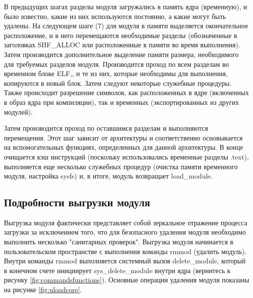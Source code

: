 В предыдущих шагах разделы модуля загружались в память ядра (временную), и было известно, какие из них используются постоянно, а какие могут быть удалены. 
На следующем шаге (7) для модуля в памяти выделяется окончательное расположение, и в него перемещаются необходимые разделы (обозначенные в заголовках SHF\_ALLOC или расположенные в памяти во время выполнения). 
Затем производится дополнительное выделение памяти размера, необходимого для требуемых разделов модуля. 
Производится проход по всем разделам во временном блоке ELF,, и те из них, которые необходимы для выполнения, копируются в новый блок. 
Затем следуют некоторые служебные процедуры. 
Также происходит разрешение символов, как расположенных в ядре (включенных в образ ядра при компиляции), так и временных (экспортированных из других модулей).

Затем производится проход по оставшимся разделам и выполняются перемещения. Этот шаг зависит от архитектуры и соответственно основывается на вспомогательных функциях, определенных для данной архитектуры.
В конце очищается кэш инструкций (поскольку использовались временные разделы .text), выполняется еще несколько служебных процедур (очистка памяти временного модуля, настройка sysfs) и, в итоге, модуль возвращает load\_module.

\subsection{Подробности выгрузки модуля}
Выгрузка модуля фактически представляет собой зеркальное отражение процесса загрузки за исключением того, что для безопасного удаления модуля необходимо выполнить несколько "санитарных проверок". Выгрузка модуля начинается в пользовательском пространстве с выполнения команды rmmod (удалить модуль). 
Внутри команды rmmod выполняется системный вызов delete\_module, который в конечном счете инициирует sys\_delete\_module внутри ядра (вернитесь к рисунку \ref{fig:commandsfunctions}). Основные операции удаления модуля показаны на рисунке \ref{fig:uloadcore}.

